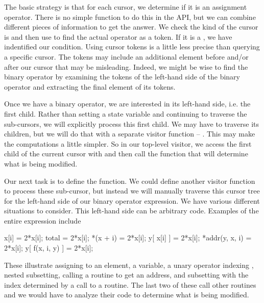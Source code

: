 The basic strategy is that for each cursor, we determine if it is an
assignment operator. There is no simple function to do this in the
\libclang{} API, but we can combine different pieces of information to
get the answer. We check the kind of the cursor is
 and then use  to
find the actual operator as a token.  If it is a \dquote{=}, we have
indentified our condition.  Using cursor tokens is a little less
precise than querying a specific cursor. The tokens may include an
additional element before and/or after our cursor that may be
misleading.  Indeed, we might be wise to find the binary operator by
examining the tokens of the left-hand side of the binary operator and
extracting the final element of its tokens.

Once we have a binary operator, we are interested in its left-hand
side, i.e. the first child.  Rather than setting a state variable and
continuing to traverse the sub-cursors, we will explicitly process
this first child. We may have to traverse its children, but we will do
that with a separate visitor function -- .  This may
make the computations a little simpler.  So in our top-level visitor,
we access the first child of the current cursor with 
and  then call the function that will determine what is being modified.

Our next task is to define the  function.  We could
define another visitor function to process these sub-cursor, but
instead we will manually traverse this cursor tree for the left-hand
side of our binary operator expression.  We have various different
situations to consider.  This left-hand side can be arbitrary \C{}
code. Examples of the entire expression include
\begin{CCode}
x[i] = 2*x[i];
total = 2*x[i];
*(x + i) = 2*x[i];  
y[ x[i] ] = 2*x[i];
*addr(y, x, i) = 2*x[i];
y[ f(x, i, y) ] = 2*x[i];
\end{CCode}
These illustrate assigning to an element, a variable,
a unary operator indexing , nested subsetting, 
calling a routine to get an address, and subsetting
with the index determined by a call to a routine.
The last two of these call other routines and we would have
to analyze their code to determine what is being modified.

